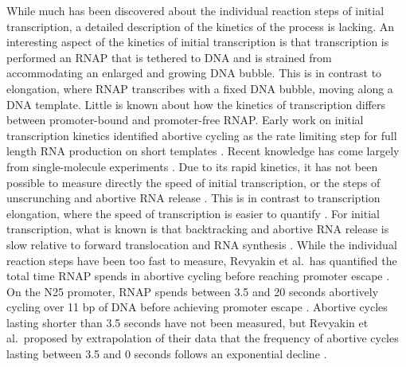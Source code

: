 While much has been discovered about the individual reaction steps of initial
transcription, a detailed description of the kinetics of the process is
lacking. An interesting aspect of the kinetics of initial transcription is
that transcription is performed an RNAP that is tethered to DNA and
is strained from accommodating an enlarged and growing DNA bubble. This is in
contrast to elongation, where RNAP transcribes with a fixed DNA bubble, moving
along a DNA template. Little is known about how the kinetics of transcription
differs between promoter-bound and promoter-free RNAP. Early work on initial
transcription kinetics identified abortive cycling as the rate limiting step
for full length RNA production on short templates \cite{stefano_lac_1979,
munson_abortive_1981}. Recent knowledge has come largely from single-molecule
experiments \cite{revyakin_abortive_2006, kapanidis_initial_2006,
tang_real-time_2009, kapanidis_retention_2005, margeat_direct_2006}. Due to
its rapid kinetics, it has not been possible to measure directly the speed of
initial transcription, or the steps of unscrunching and abortive RNA release
\cite{revyakin_abortive_2006, margeat_direct_2006}. This is in contrast to
transcription elongation, where the speed of transcription is easier to
quantify \cite{wang_force_1998, tolic-norrelykke_diversity_2004,
bai_mechanochemical_2007}. For initial transcription, what is known is that
backtracking and abortive RNA release is slow relative to forward
translocation and RNA synthesis \cite{revyakin_abortive_2006,
margeat_direct_2006}. While the individual reaction steps have been too fast
to measure, Revyakin et al.\ has quantified the total time RNAP spends in
abortive cycling before reaching promoter escape
\cite{revyakin_abortive_2006}. On the N25 promoter, RNAP spends between 3.5
and 20 seconds abortively cycling over 11 bp of DNA before achieving promoter
escape \cite{revyakin_abortive_2006}. Abortive cycles lasting shorter than 3.5
seconds have not been measured, but Revyakin et al.\ proposed by extrapolation
of their data that the frequency of abortive cycles lasting between 3.5 and 0
seconds follows an exponential decline \cite{revyakin_abortive_2006}.  

